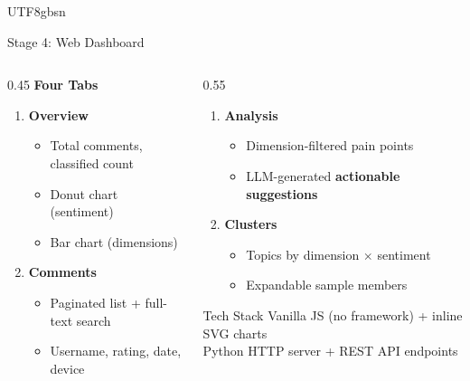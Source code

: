 \documentclass[11pt,aspectratio=169]{beamer}
\newenvironment{benumerate}
  {\setcounter{enumi}{0}\begin{enumerate}}
  {\end{enumerate}}
\begin{document}
\begin{CJK*}{UTF8}{gbsn}
\begin{frame}{Stage 4: Web Dashboard}
  \begin{columns}[T]
    \begin{column}{0.45\textwidth}
      \textbf{Four Tabs}
      \begin{benumerate}
        \item \textbf{Overview}
              \begin{itemize}\footnotesize
                \item Total comments, classified count
                \item Donut chart (sentiment)
                \item Bar chart (dimensions)
              \end{itemize}
        \item \textbf{Comments}
              \begin{itemize}\footnotesize
                \item Paginated list + full-text search
                \item Username, rating, date, device
              \end{itemize}
      \end{benumerate}
    \end{column}
    \begin{column}{0.55\textwidth}
      \setcounter{enumi}{2}
      \begin{enumerate}
        \item \textbf{Analysis}
              \begin{itemize}\footnotesize
                \item Dimension-filtered pain points
                \item LLM-generated \textbf{actionable suggestions}
              \end{itemize}
        \item \textbf{Clusters}
              \begin{itemize}\footnotesize
                \item Topics by dimension $\times$ sentiment
                \item Expandable sample members
              \end{itemize}
      \end{enumerate}

      \vspace{0.3cm}
      \begin{block}{Tech Stack}
        \footnotesize
        Vanilla JS (no framework) + inline SVG charts\\
        Python HTTP server + REST API endpoints
      \end{block}
    \end{column}
  \end{columns}
\end{frame}


\end{CJK*}
\end{document}

